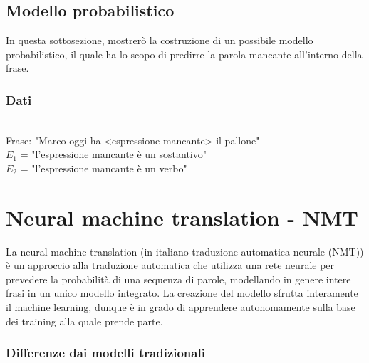 \subsection{Modello probabilistico}

In questa sottosezione, mostrerò la costruzione di un possibile modello probabilistico, il quale ha lo scopo di predirre la parola mancante all'interno della frase.

\subsubsection{Dati}

\\
Frase: "Marco oggi ha <espressione mancante> il pallone"
\\
$E_{1}$ = "l'espressione mancante è un sostantivo"
\\
$E_{2}$ = "l'espressione mancante è un verbo"


\newpage

\section{Neural machine translation - NMT}                 %
La neural machine translation (in italiano traduzione automatica neurale (NMT))  è un approccio alla traduzione automatica che utilizza una rete neurale per prevedere la probabilità di una sequenza di parole, modellando in genere intere frasi in un unico modello integrato. La creazione del modello sfrutta interamente il machine learning, dunque è in grado di apprendere autonomamente sulla base dei training alla quale prende parte. 

\subsubsection{Differenze dai modelli tradizionali}

